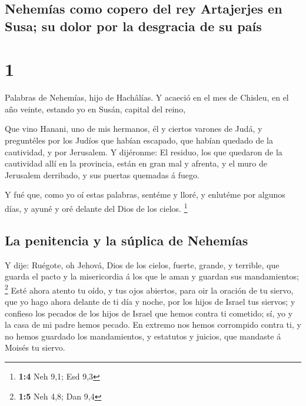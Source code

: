 \hypertarget{nehemuxedas-como-copero-del-rey-artajerjes-en-susa-su-dolor-por-la-desgracia-de-su-pauxeds}{%
\subsection{Nehemías como copero del rey Artajerjes en Susa; su dolor
por la desgracia de su
país}\label{nehemuxedas-como-copero-del-rey-artajerjes-en-susa-su-dolor-por-la-desgracia-de-su-pauxeds}}

\hypertarget{section}{%
\section{1}\label{section}}

 Palabras de Nehemías, hijo de Hachâlías. Y acaeció en el
mes de Chisleu, en el año veinte, estando yo en Susán, capital del
reino,

 Que vino Hanani, uno de mis hermanos, él y ciertos varones
de Judá, y preguntéles por los Judíos que habían escapado, que habían
quedado de la cautividad, y por Jerusalem.  Y dijéronme: El
residuo, los que quedaron de la cautividad allí en la provincia, están
en gran mal y afrenta, y el muro de Jerusalem derribado, y sus puertas
quemadas á fuego.

 Y fué que, como yo oí estas palabras, sentéme y lloré, y
enlutéme por algunos días, y ayuné y oré delante del Dios de los cielos.
\footnote{\textbf{1:4} Neh 9,1; Esd 9,3}

\hypertarget{la-penitencia-y-la-suxfaplica-de-nehemuxedas}{%
\subsection{La penitencia y la súplica de
Nehemías}\label{la-penitencia-y-la-suxfaplica-de-nehemuxedas}}

 Y dije: Ruégote, oh Jehová, Dios de los cielos, fuerte,
grande, y terrible, que guarda el pacto y la misericordia á los que le
aman y guardan sus mandamientos; \footnote{\textbf{1:5} Neh 4,8; Dan 9,4}
 Esté ahora atento tu oído, y tus ojos abiertos, para oir la
oración de tu siervo, que yo hago ahora delante de ti día y noche, por
los hijos de Israel tus siervos; y confieso los pecados de los hijos de
Israel que hemos contra ti cometido; sí, yo y la casa de mi padre hemos
pecado.  En extremo nos hemos corrompido contra ti, y no
hemos guardado los mandamientos, y estatutos y juicios, que mandaste á
Moisés tu siervo.

